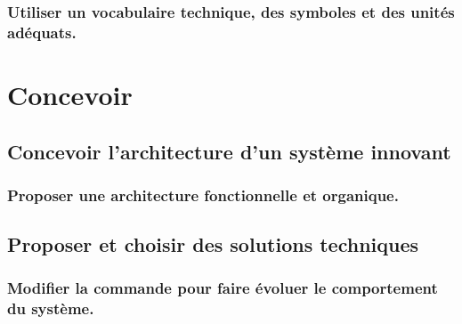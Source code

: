 \documentclass[10pt,fleqn]{book}
\newcommand{\repRel}{../..}
\newcommand{\repStyle}{\repRel/Style}
\newcommand{\td}{fichier_td}
\newcommand{\repExos}{\repRel/ExercicesCompetences}
\newcommand{\repExo}{dossier}
\begin{document}
\renewcommand{\repExo}{\repExos/E2_ProduireInformation/E2_05_Dessin2D/1020_PompeEnsieta}
\renewcommand{\td}{1020_PompeEnsieta}
\graphicspath{{\repStyle/png/}{\repExo/images/}}


\subsection{Utiliser un vocabulaire technique, des symboles et des unités adéquats.} 

\chapter{Concevoir} 

\section{Concevoir l'architecture d'un système innovant} 

\subsection{Proposer une architecture fonctionnelle et organique.} 

\section{Proposer et choisir des solutions techniques} 

\subsection{Modifier la commande pour faire évoluer le comportement du système. } 
\end{document}
